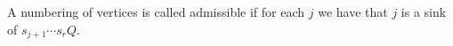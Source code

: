 A numbering of vertices is called admissible if for each $j$ we have that
$j$ is a sink of $s_{j+1}\cdots s_rQ$.

